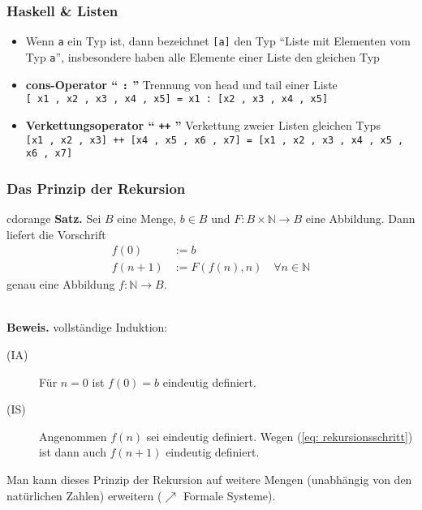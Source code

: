 \documentclass[aspectratio=1610,onlymath, ngerman]{beamer}
\renewcommand{\emph}[1]{\textbf{#1}}
\begin{document}
    \begin{frame}\frametitle{Haskell \& Listen}
        \begin{itemize}
            \item Wenn \texttt{a} ein Typ ist, dann bezeichnet \texttt{[a]} den Typ ``Liste mit Elementen vom Typ \texttt{a}'', insbesondere
            haben alle Elemente einer Liste den gleichen Typ
            \bigskip \pause
            \item \emph{cons-Operator `` \texttt{:} ''} \qquad Trennung von head und tail einer Liste \\
            \texttt{[ x1 , x2 , x3 , x4 , x5] = x1 : [x2 , x3 , x4 , x5]}
            \bigskip \pause
            \item \emph{Verkettungsoperator `` \texttt{++} ''} \qquad Verkettung zweier Listen gleichen Typs \\
            \texttt{[x1 , x2 , x3] ++ [x4 , x5 , x6 , x7] = [x1 , x2 , x3 , x4 , x5 , x6 , x7]}
        \end{itemize}
    \end{frame}

    \begin{frame}\frametitle{Das Prinzip der Rekursion}
        \begin{doodle}{cdorange}
            \emph{Satz.}
            Sei $B$ eine Menge, $b \in B$ und $F \colon B \times \mathbb{N} \to B$ eine Abbildung. Dann liefert die Vorschrift
            \begin{subequations}
                \begin{align}
                    f(0) &:= b \\
                    f(n+1) &:= F(f(n),n) \quad \forall n \in \mathbb{N} \label{eq: rekursionsschritt}
                \end{align}
            \end{subequations}
            genau eine Abbildung $f : \mathbb{N} \to B$.
        \end{doodle} \\
        \bigskip
        \pause
        \emph{Beweis.} \qquad vollständige Induktion:
        \begin{description}
            \item[(IA)] Für $n=0$ ist $f(0) = b$ eindeutig definiert.
            \item[(IS)] Angenommen $f(n)$ sei eindeutig definiert. Wegen (\ref{eq: rekursionsschritt}) ist dann auch $f(n+1)$ eindeutig definiert.
        \end{description}
        
        \bigskip
        
        Man kann dieses Prinzip der Rekursion auf weitere Mengen (unabhängig von den natürlichen Zahlen) erweitern ($\nearrow$ Formale Systeme).
    \end{frame}
\end{document}

